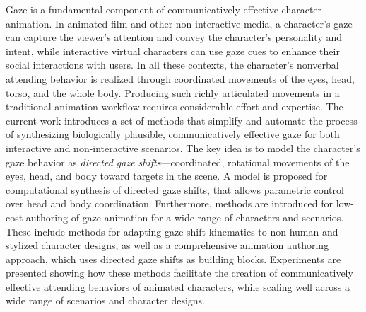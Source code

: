 Gaze is a fundamental component of communicatively effective character animation. In animated film and other non-interactive media, a character's gaze can capture the viewer's attention and convey the character's personality and intent, while interactive virtual characters can use gaze cues to enhance their social interactions with users. In all these contexts, the character's nonverbal attending behavior is realized through coordinated movements of the eyes, head, torso, and the whole body. Producing such richly articulated movements in a traditional animation workflow requires considerable effort and expertise. The current work introduces a set of methods that simplify and automate the process of synthesizing biologically plausible, communicatively effective gaze for both interactive and non-interactive scenarios. The key idea is to model the character's gaze behavior as \emph{directed gaze shifts}---coordinated, rotational movements of the eyes, head, and body toward targets in the scene. A model is proposed for computational synthesis of directed gaze shifts, that allows parametric control over head and body coordination. Furthermore, methods are introduced for low-cost authoring of gaze animation for a wide range of characters and scenarios. These include methods for adapting gaze shift kinematics to non-human and stylized character designs, as well as a comprehensive animation authoring approach, which uses directed gaze shifts as building blocks. Experiments are presented showing how these methods facilitate the creation of communicatively effective attending behaviors of animated characters, while scaling well across a wide range of scenarios and character designs.
